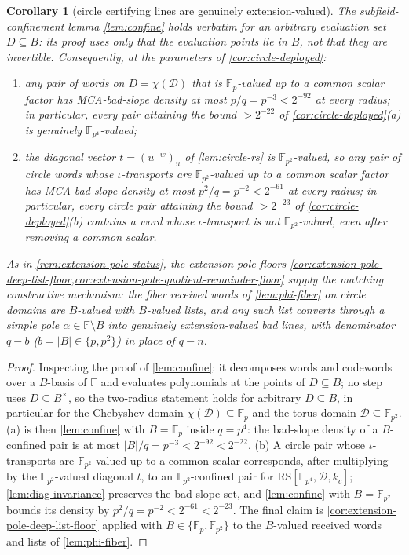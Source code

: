 \documentclass[11pt]{article}
\newtheorem{corollary}[theorem]{Corollary}
\theoremstyle{definition}
\theoremstyle{remark}
\newcommand{\F}{\mathbb{F}}
\newcommand{\B}{B}
\newcommand{\RS}{\mathrm{RS}}
\begin{document}
\begin{corollary}[circle certifying lines are genuinely extension-valued]\label{cor:circle-Fvalued}
The subfield-confinement lemma \cref{lem:confine} holds verbatim for an arbitrary evaluation set $D\subseteq\B$: its proof uses only that the evaluation points lie in $\B$, not that they are invertible. Consequently, at the parameters of \cref{cor:circle-deployed}:
\begin{enumerate}[label=\textup{(\alph*)}]
\item any pair of words on $D=\chi(\mathcal D)$ that is $\F_p$-valued up to a common scalar factor has MCA-bad-slope density at most $p/q=p^{-3}<2^{-92}$ at every radius; in particular, every pair attaining the bound $>2^{-22}$ of \cref{cor:circle-deployed}\textup{(a)} is genuinely $\F_{p^4}$-valued;
\item the diagonal vector $t=(u^{-w})_{u}$ of \cref{lem:circle-rs} is $\F_{p^2}$-valued, so any pair of circle words whose $\iota$-transports are $\F_{p^2}$-valued up to a common scalar factor has MCA-bad-slope density at most $p^2/q=p^{-2}<2^{-61}$ at every radius; in particular, every circle pair attaining the bound $>2^{-23}$ of \cref{cor:circle-deployed}\textup{(b)} contains a word whose $\iota$-transport is not $\F_{p^2}$-valued, even after removing a common scalar.
\end{enumerate}
As in \cref{rem:extension-pole-status}, the extension-pole floors \cref{cor:extension-pole-deep-list-floor,cor:extension-pole-quotient-remainder-floor} supply the matching constructive mechanism: the fiber received words of \cref{lem:phi-fiber} on circle domains are $\B$-valued with $\B$-valued lists, and any such list converts through a simple pole $\alpha\in\F\setminus\B$ into genuinely extension-valued bad lines, with denominator $q-b$ ($b=|\B|\in\{p,p^2\}$) in place of $q-n$.
\end{corollary}

\begin{proof}
Inspecting the proof of \cref{lem:confine}: it decomposes words and codewords over a $\B$-basis of $\F$ and evaluates polynomials at the points of $D\subseteq\B$; no step uses $D\subseteq\B^{\times}$, so the two-radius statement holds for arbitrary $D\subseteq\B$, in particular for the Chebyshev domain $\chi(\mathcal D)\subseteq\F_p$ and the torus domain $\mathcal D\subseteq\F_{p^2}$. (a) is then \cref{lem:confine} with $\B=\F_p$ inside $q=p^4$: the bad-slope density of a $\B$-confined pair is at most $|\B|/q=p^{-3}<2^{-92}<2^{-22}$. (b) A circle pair whose $\iota$-transports are $\F_{p^2}$-valued up to a common scalar corresponds, after multiplying by the $\F_{p^2}$-valued diagonal $t$, to an $\F_{p^2}$-confined pair for $\RS[\F_{p^4},\mathcal D,k_c]$; \cref{lem:diag-invariance} preserves the bad-slope set, and \cref{lem:confine} with $\B=\F_{p^2}$ bounds its density by $p^2/q=p^{-2}<2^{-61}<2^{-23}$. The final claim is \cref{cor:extension-pole-deep-list-floor} applied with $\B\in\{\F_p,\F_{p^2}\}$ to the $\B$-valued received words and lists of \cref{lem:phi-fiber}.
\end{proof}
\end{document}
